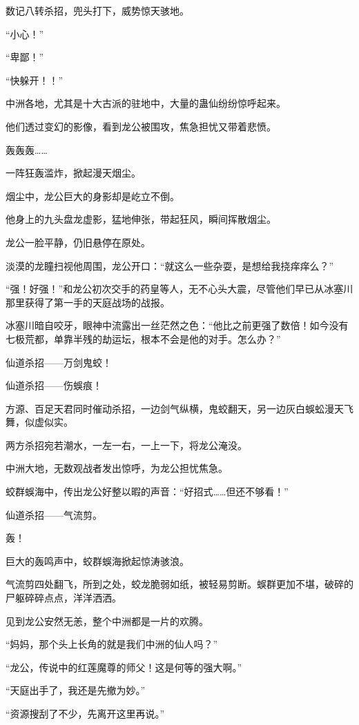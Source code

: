 \begin{this_body}
数记八转杀招，兜头打下，威势惊天骇地。

“小心！”

“卑鄙！”

“快躲开！！”

中洲各地，尤其是十大古派的驻地中，大量的蛊仙纷纷惊呼起来。

他们透过变幻的影像，看到龙公被围攻，焦急担忧又带着悲愤。

轰轰轰……

一阵狂轰滥炸，掀起漫天烟尘。

烟尘中，龙公巨大的身影却是屹立不倒。

他身上的九头盘龙虚影，猛地伸张，带起狂风，瞬间挥散烟尘。

龙公一脸平静，仍旧悬停在原处。

淡漠的龙瞳扫视他周围，龙公开口：“就这么一些杂耍，是想给我挠痒痒么？”

“强！好强！”和龙公初次交手的药皇等人，无不心头大震，尽管他们早已从冰塞川那里获得了第一手的天庭战场的战报。

冰塞川暗自咬牙，眼神中流露出一丝茫然之色：“他比之前更强了数倍！如今没有七极荒都，单靠半残的劫运坛，根本不会是他的对手。怎么办？”

仙道杀招——万剑鬼蛟！

仙道杀招——伤蜈痕！

方源、百足天君同时催动杀招，一边剑气纵横，鬼蛟翻天，另一边灰白蜈蚣漫天飞舞，似虚似实。

两方杀招宛若潮水，一左一右，一上一下，将龙公淹没。

中洲大地，无数观战者发出惊呼，为龙公担忧焦急。

蛟群蜈海中，传出龙公好整以暇的声音：“好招式……但还不够看！”

仙道杀招——气流剪。

轰！

巨大的轰鸣声中，蛟群蜈海掀起惊涛骇浪。

气流剪四处翻飞，所到之处，蛟龙脆弱如纸，被轻易剪断。蜈群更加不堪，破碎的尸躯碎碎点点，洋洋洒洒。

见到龙公安然无恙，整个中洲都是一片的欢腾。

“妈妈，那个头上长角的就是我们中洲的仙人吗？”

“龙公，传说中的红莲魔尊的师父！这是何等的强大啊。”

“天庭出手了，我还是先撤为妙。”

“资源搜刮了不少，先离开这里再说。”


\end{this_body}
